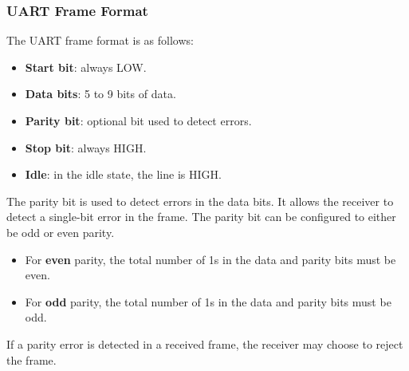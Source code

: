 \documentclass[a4paper]{report}
\begin{document}
\subsubsection{UART Frame Format}
The UART frame format is as follows:
\begin{itemize}
    \item \textbf{Start bit}: always LOW\@.
    \item \textbf{Data bits}: 5 to 9 bits of data\@.
    \item \textbf{Parity bit}: optional bit used to detect errors.
    \item \textbf{Stop bit}: always HIGH\@.
    \item \textbf{Idle}: in the idle state, the line is HIGH\@.
\end{itemize}
The parity bit is used to detect errors in the data bits. It allows the receiver to
detect a single-bit error in the frame. The parity bit can be configured to either be
odd or even parity.
\begin{itemize}
    \item For \textbf{even} parity, the total number of 1s in the data and parity bits must be even.
    \item For \textbf{odd} parity, the total number of 1s in the data and parity bits must be odd.
\end{itemize}
If a parity error is detected in a received frame, the receiver may choose to reject the frame.
\end{document}
